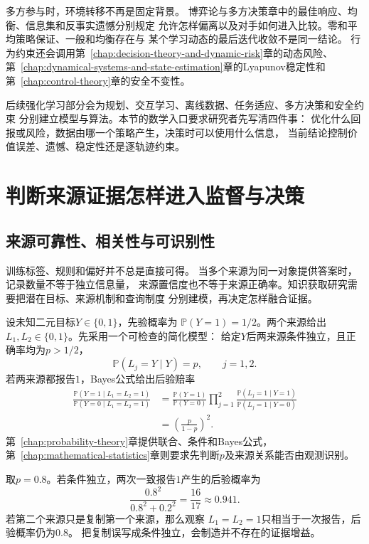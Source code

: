 多方参与时，环境转移不再是固定背景。
博弈论与多方决策章中的最佳响应、均衡、信息集和反事实遗憾分别规定
允许怎样偏离以及对手如何进入比较。零和平均策略保证、一般和均衡存在与
某个学习动态的最后迭代收敛不是同一结论。
行为约束还会调用第~\ref{chap:decision-theory-and-dynamic-risk}章的动态风险、
第~\ref{chap:dynamical-systems-and-state-estimation}章的Lyapunov稳定性和
第~\ref{chap:control-theory}章的安全不变性。

后续强化学习部分会为规划、交互学习、离线数据、任务适应、多方决策和安全约束
分别建立模型与算法。本节的数学入口要求研究者先写清四件事：
优化什么回报或风险，数据由哪一个策略产生，决策时可以使用什么信息，
当前结论控制价值误差、遗憾、稳定性还是逐轨迹约束。

\section{判断来源证据怎样进入监督与决策}
\label{sec:future-knowledge-acquisition-fusion}

\subsection{来源可靠性、相关性与可识别性}
\label{sec:future-source-answers-reliability-identifiability}

训练标签、规则和偏好并不总是直接可得。
当多个来源为同一对象提供答案时，记录数量不等于独立信息量，
来源置信度也不等于来源正确率。知识获取研究需要把潜在目标、来源机制和查询制度
分别建模，再决定怎样融合证据。

设未知二元目标$Y\in\{0,1\}$，先验概率为
$\mathbb{P}(Y=1)=1/2$。两个来源给出
$L_1,L_2\in\{0,1\}$。先采用一个可检查的简化模型：
给定$Y$后两来源条件独立，且正确率均为$p>1/2$，
\[
  \mathbb{P}(L_j=Y\mid Y)=p,
  \qquad j=1,2.
\]
若两来源都报告$1$，Bayes公式给出后验赔率
\begin{align}
  \frac{
    \mathbb{P}(Y=1\mid L_1=L_2=1)
  }{
    \mathbb{P}(Y=0\mid L_1=L_2=1)
  }
  &=
  \frac{\mathbb{P}(Y=1)}{\mathbb{P}(Y=0)}
  \prod_{j=1}^{2}
  \frac{
    \mathbb{P}(L_j=1\mid Y=1)
  }{
    \mathbb{P}(L_j=1\mid Y=0)
  }
  \nonumber\\
  &=
  \left(\frac{p}{1-p}\right)^2.
  \label{eq:future-source-fusion-odds}
\end{align}
第~\ref{chap:probability-theory}章提供联合、条件和Bayes公式，
第~\ref{chap:mathematical-statistics}章则要求先判断$p$及来源关系能否由观测识别。

\begin{example}[独立来源与复制来源]
  \label{ex:future-source-dependence}
  取$p=0.8$。若条件独立，两次一致报告$1$产生的后验概率为
  \[
    \frac{0.8^2}{0.8^2+0.2^2}
    =
    \frac{16}{17}
    \approx0.941.
  \]
  若第二个来源只是复制第一个来源，那么观察
  $L_1=L_2=1$只相当于一次报告，后验概率仍为$0.8$。
  把复制误写成条件独立，会制造并不存在的证据增益。
\end{example}

